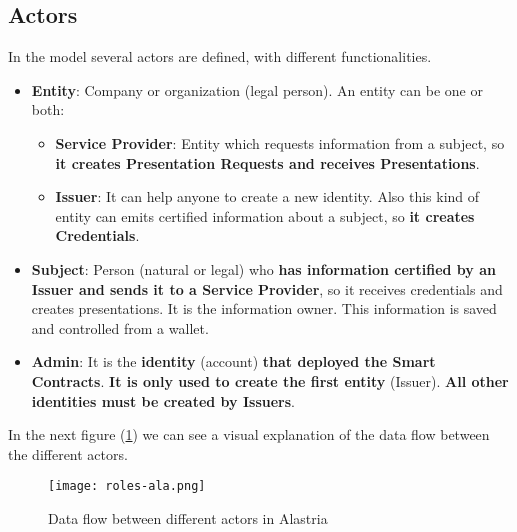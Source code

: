 \subsection{Actors}
In the model several actors are defined, with different functionalities.
\begin{itemize}
    \item \textbf{Entity}: Company or organization (legal person). An entity can be one or both:
          \begin{itemize}
              \item \textbf{Service Provider}: Entity which requests information from a subject, so \textbf{it creates Presentation Requests and receives Presentations}.
              \item \textbf{Issuer}: It can help anyone to create a new identity. Also this kind of entity can emits certified information about a subject, so \textbf{it creates Credentials}.
          \end{itemize}
    \item \textbf{Subject}: Person (natural or legal) who \textbf{has information certified by an Issuer and sends it to a Service Provider}, so it receives credentials and creates presentations. It is the information owner. This information is saved and controlled from a wallet.
    \item \textbf{Admin}: It is the \textbf{identity} (account) \textbf{that deployed the Smart Contracts}. \textbf{It is only used to create the first entity} (Issuer). \textbf{All other identities must be created by Issuers}.
\end{itemize}
In the next figure (\ref{fig:roles-ala}) we can see a visual explanation of the data flow between the different actors.
\begin{figure}[h]
    \centering
    \texttt{[image: roles-ala.png]}
    \caption{Data flow between different actors in Alastria}
    \label{fig:roles-ala}
\end{figure}
